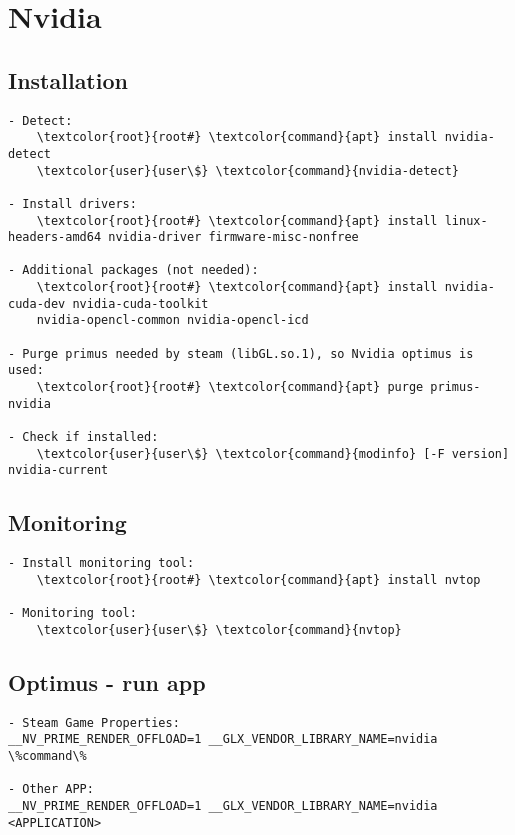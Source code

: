 \documentclass[10pt, a4paper, onecolumn, openany]{book} %
\begin{document}
\section{Nvidia}
\subsection{Installation}
\begin{Verbatim}[commandchars=\\\{\}]
- Detect:
    \textcolor{root}{root#} \textcolor{command}{apt} install nvidia-detect
    \textcolor{user}{user\$} \textcolor{command}{nvidia-detect}

- Install drivers:
    \textcolor{root}{root#} \textcolor{command}{apt} install linux-headers-amd64 nvidia-driver firmware-misc-nonfree

- Additional packages (not needed):
    \textcolor{root}{root#} \textcolor{command}{apt} install nvidia-cuda-dev nvidia-cuda-toolkit    
    nvidia-opencl-common nvidia-opencl-icd
    
- Purge primus needed by steam (libGL.so.1), so Nvidia optimus is used:
    \textcolor{root}{root#} \textcolor{command}{apt} purge primus-nvidia
    
- Check if installed:
    \textcolor{user}{user\$} \textcolor{command}{modinfo} [-F version] nvidia-current
\end{Verbatim}
\subsection{Monitoring}
\begin{Verbatim}[commandchars=\\\{\}]
- Install monitoring tool:
    \textcolor{root}{root#} \textcolor{command}{apt} install nvtop
    
- Monitoring tool:
    \textcolor{user}{user\$} \textcolor{command}{nvtop}
\end{Verbatim}
\subsection{Optimus - run app}
\begin{Verbatim}[commandchars=\\\{\}]
- Steam Game Properties:
__NV_PRIME_RENDER_OFFLOAD=1 __GLX_VENDOR_LIBRARY_NAME=nvidia \%command\%

- Other APP:
__NV_PRIME_RENDER_OFFLOAD=1 __GLX_VENDOR_LIBRARY_NAME=nvidia <APPLICATION>
\end{Verbatim}
\end{document}
